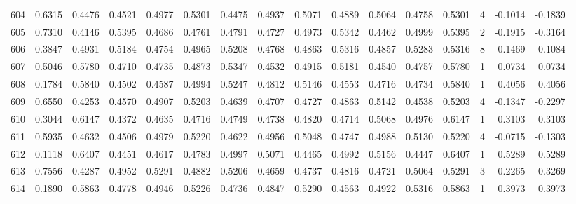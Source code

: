 \begin{tabular}{lrrrrrrrrrrrrrrr}
604 &      0.6315 &  0.4476 &  0.4521 &  0.4977 &  0.5301 &  0.4475 &  0.4937 &  0.5071 &  0.4889 &  0.5064 &   0.4758 &     0.5301 &      4 &                   -0.1014 &                    -0.1839 \\
605 &      0.7310 &  0.4146 &  0.5395 &  0.4686 &  0.4761 &  0.4791 &  0.4727 &  0.4973 &  0.5342 &  0.4462 &   0.4999 &     0.5395 &      2 &                   -0.1915 &                    -0.3164 \\
606 &      0.3847 &  0.4931 &  0.5184 &  0.4754 &  0.4965 &  0.5208 &  0.4768 &  0.4863 &  0.5316 &  0.4857 &   0.5283 &     0.5316 &      8 &                    0.1469 &                     0.1084 \\
607 &      0.5046 &  0.5780 &  0.4710 &  0.4735 &  0.4873 &  0.5347 &  0.4532 &  0.4915 &  0.5181 &  0.4540 &   0.4757 &     0.5780 &      1 &                    0.0734 &                     0.0734 \\
608 &      0.1784 &  0.5840 &  0.4502 &  0.4587 &  0.4994 &  0.5247 &  0.4812 &  0.5146 &  0.4553 &  0.4716 &   0.4734 &     0.5840 &      1 &                    0.4056 &                     0.4056 \\
609 &      0.6550 &  0.4253 &  0.4570 &  0.4907 &  0.5203 &  0.4639 &  0.4707 &  0.4727 &  0.4863 &  0.5142 &   0.4538 &     0.5203 &      4 &                   -0.1347 &                    -0.2297 \\
610 &      0.3044 &  0.6147 &  0.4372 &  0.4635 &  0.4716 &  0.4749 &  0.4738 &  0.4820 &  0.4714 &  0.5068 &   0.4976 &     0.6147 &      1 &                    0.3103 &                     0.3103 \\
611 &      0.5935 &  0.4632 &  0.4506 &  0.4979 &  0.5220 &  0.4622 &  0.4956 &  0.5048 &  0.4747 &  0.4988 &   0.5130 &     0.5220 &      4 &                   -0.0715 &                    -0.1303 \\
612 &      0.1118 &  0.6407 &  0.4451 &  0.4617 &  0.4783 &  0.4997 &  0.5071 &  0.4465 &  0.4992 &  0.5156 &   0.4447 &     0.6407 &      1 &                    0.5289 &                     0.5289 \\
613 &      0.7556 &  0.4287 &  0.4952 &  0.5291 &  0.4882 &  0.5206 &  0.4659 &  0.4737 &  0.4816 &  0.4721 &   0.5064 &     0.5291 &      3 &                   -0.2265 &                    -0.3269 \\
614 &      0.1890 &  0.5863 &  0.4778 &  0.4946 &  0.5226 &  0.4736 &  0.4847 &  0.5290 &  0.4563 &  0.4922 &   0.5316 &     0.5863 &      1 &                    0.3973 &                     0.3973 \\

\end{tabular}
